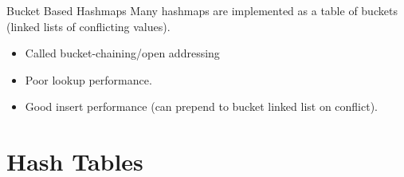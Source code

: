\begin{sidenotebox}{Bucket Based Hashmaps}
    Many hashmaps are implemented as a table of buckets (linked lists of conflicting values). 
    \begin{itemize}
        \item Called bucket-chaining/open addressing
        \item Poor lookup performance.
        \item Good insert performance (can prepend to bucket linked list on conflict).
    \end{itemize}
\end{sidenotebox}


\section{Hash Tables}

